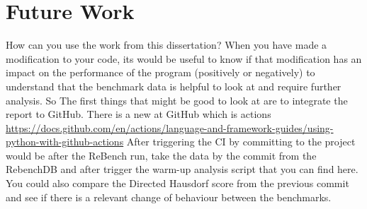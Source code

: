 \documentclass{article}
\begin{document}
\section{Future Work}

How can you use the work from this dissertation?
When you have made a modification to your code, its would be useful to know if that modification has an impact on the performance of the program (positively or negatively) to understand that the benchmark data is helpful to look at and require further analysis. So The first things that might be good to look at are to integrate the report to GitHub. There is a new  at GitHub which is  actions \url{https://docs.github.com/en/actions/language-and-framework-guides/using-python-with-github-actions}
After triggering the CI by committing to the project would be after the ReBench run, take the data by the commit from the RebenchDB and after trigger the warm-up analysis script that you can find here.
You could also compare the Directed Hausdorf score from the previous commit and see if there is a relevant change of behaviour between the benchmarks. 


\end{document}
